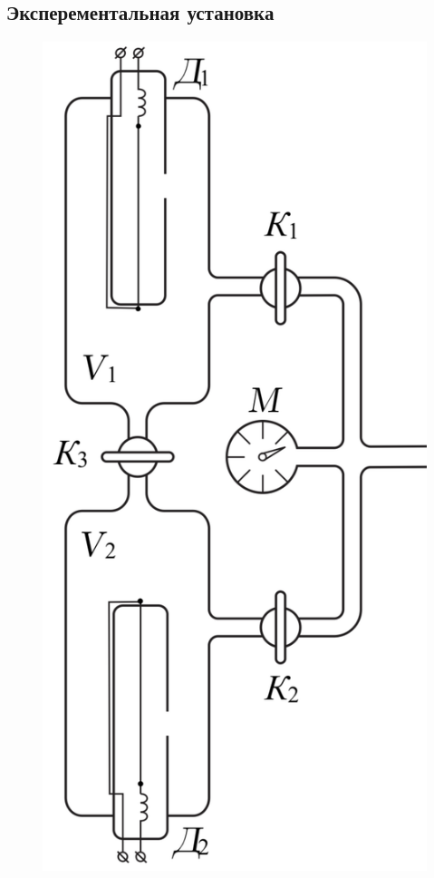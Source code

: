 \documentclass[a4paper,12pt]{article}
\theoremstyle{plain} %
\theoremstyle{definition} %
\theoremstyle{remark} %
\begin{document}
\subsection{Эксперементальная установка}
\begin{figure}[h]
	\begin{center}
		\begin{minipage}[h]{0.25\linewidth}
			\includegraphics[width=1\linewidth]{2}

\end{minipage}
\end{center}
\end{figure}
\end{document}
